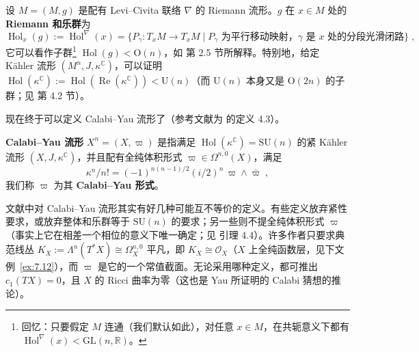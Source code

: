 \begin{Def}\label{def:7.5}
设 $M=(M,g)$ 是配有 Levi–Civita 联络 $\nabla$ 的 Riemann 流形。$g$ 在 $x\in M$ 处的 \textbf{Riemann 和乐群}为
\[
\operatorname{Hol}_x(g):=\operatorname{Hol}^\nabla(x)=\{P_\gamma:T_xM\to T_xM\mid P_\gamma\text{ 为平行移动映射，}\gamma\text{ 是 }x\text{ 处的分段光滑闭路}\}\;,
\]
它可以看作子群\footnote{回忆：只要假定 $M$ 连通（我们默认如此），对任意 $x\in M$，在共轭意义下都有 $\operatorname{Hol}^\nabla(x)<\mathrm{GL}(n,\mathbb R)$。} $\operatorname{Hol}(g)<\mathrm O(n)$，如 \cite{GHJ03} 第 2.5 节所解释。特别地，给定 Kähler 流形 $(M^n,J,\kappa^{\mathbb C})$，可以证明 $\operatorname{Hol}(\kappa^{\mathbb C}):=\operatorname{Hol}(\operatorname{Re}(\kappa^{\mathbb C}))<\mathrm U(n)$（而 $\mathrm U(n)$ 本身又是 $\mathrm O(2n)$ 的子群；见 \cite{GHJ03} 第 4.2 节）。
\end{Def}

现在终于可以定义 Calabi–Yau 流形了（参考文献为 \cite{GHJ03} 的定义 4.3）。

\begin{Def}\label{def:7.6}
\textbf{Calabi–Yau 流形} $X^n=(X,\varpi)$ 是指满足 $\operatorname{Hol}(\kappa^{\mathbb C})=\mathrm{SU}(n)$ 的紧 Kähler 流形 $(X,J,\kappa^{\mathbb C})$，并且配有全纯体积形式 $\varpi\in\Omega^{n,0}(X)$，满足
\[
\kappa^n/n!=(-1)^{n(n-1)/2}(i/2)^n\,\varpi\wedge\bar\varpi\;,
\]
我们称 $\varpi$ 为其 \textbf{Calabi–Yau 形式}。
\end{Def}

\begin{Rem}[警告]\label{rem:7.7}
文献中对 Calabi–Yau 流形其实有好几种可能互不等价的定义。有些定义放弃紧性要求，或放弃整体和乐群等于 $\mathrm{SU}(n)$ 的要求；另一些则不提全纯体积形式 $\varpi$（事实上它在相差一个相位的意义下唯一确定；见 \cite{GHJ03} 引理 4.4）。许多作者只要求典范线丛 $K_X:=\Lambda^n(T^*X)\cong\Omega^{n,0}_X$ 平凡，即 $K_X\cong\mathcal O_X$（$X$ 上全纯函数层，见下文例~\ref{ex:7.12}），而 $\varpi$ 是它的一个常值截面。无论采用哪种定义，都可推出 $c_1(TX)=0$，且 $X$ 的 Ricci 曲率为零（这也是 Yau 所证明的 Calabi 猜想的推论）。
\end{Rem}

